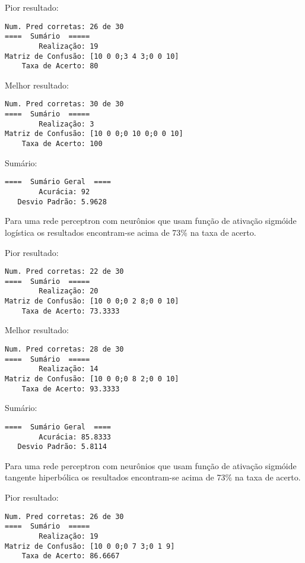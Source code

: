 Pior resultado:

\begin{verbatim}
Num. Pred corretas: 26 de 30
====  Sumário  =====
        Realização: 19
Matriz de Confusão: [10 0 0;3 4 3;0 0 10]
    Taxa de Acerto: 80
\end{verbatim}

Melhor resultado:

\begin{verbatim}
Num. Pred corretas: 30 de 30
====  Sumário  =====
        Realização: 3
Matriz de Confusão: [10 0 0;0 10 0;0 0 10]
    Taxa de Acerto: 100
\end{verbatim}

Sumário:

\begin{verbatim}
====  Sumário Geral  ====
        Acurácia: 92
   Desvio Padrão: 5.9628
\end{verbatim}

Para uma rede perceptron com neurônios que usam função de ativação
sigmóide logística os resultados encontram-se acima de 73\% na taxa de
acerto.

Pior resultado:

\begin{verbatim}
Num. Pred corretas: 22 de 30
====  Sumário  =====
        Realização: 20
Matriz de Confusão: [10 0 0;0 2 8;0 0 10]
    Taxa de Acerto: 73.3333
\end{verbatim}

Melhor resultado:

\begin{verbatim}
Num. Pred corretas: 28 de 30
====  Sumário  =====
        Realização: 14
Matriz de Confusão: [10 0 0;0 8 2;0 0 10]
    Taxa de Acerto: 93.3333
\end{verbatim}

Sumário:

\begin{verbatim}
====  Sumário Geral  ====
        Acurácia: 85.8333
   Desvio Padrão: 5.8114
\end{verbatim}

Para uma rede perceptron com neurônios que usam função de ativação
sigmóide tangente hiperbólica os resultados encontram-se acima de 73\%
na taxa de acerto.

Pior resultado:

\begin{verbatim}
Num. Pred corretas: 26 de 30
====  Sumário  =====
        Realização: 19
Matriz de Confusão: [10 0 0;0 7 3;0 1 9]
    Taxa de Acerto: 86.6667
\end{verbatim}

